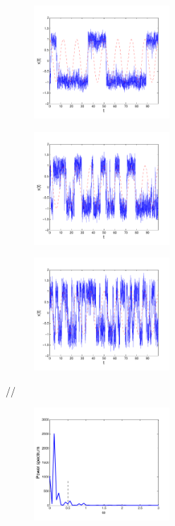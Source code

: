 \begin{figure}
	\begin{subfigure}{0.32\textwidth}
		\centering
		\includegraphics[width=2in]{18.Langevin/sr_low.pdf}
		\caption{}\label{fig:sr_l}
	\end{subfigure}
	\begin{subfigure}{0.32\textwidth}
		\centering
		\includegraphics[width=2in]{18.Langevin/sr_match.pdf}
		\caption{}\label{fig:sr_m}
	\end{subfigure}
	\begin{subfigure}{0.32\textwidth}
		\centering
		\includegraphics[width=2in]{18.Langevin/sr_high.pdf}
		\caption{}\label{fig:sr_h}
	\end{subfigure}
//
	\begin{subfigure}{0.32\textwidth}
		\centering
		\includegraphics[width=2in]{18.Langevin/sr_low_spectrum.pdf}

\end{subfigure}
\end{figure}
